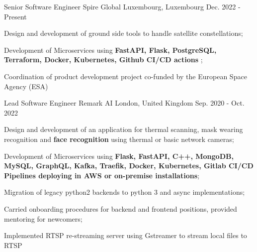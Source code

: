 

\begin{cventries}

  \cventry
  {Senior Software Engineer} %
  {Spire Global} %
  {Luxembourg, Luxembourg} %
  {Dec. 2022 - Present} %
  {
    \begin{cvitems} %
      \item {Design and development of ground side tools to handle satellite constellations;}
      \item {Development of Microservices using \textbf{FastAPI, Flask, PostgreSQL, Terraform, Docker, Kubernetes, Github CI/CD actions };}
      \item {Coordination of product development project co-funded by the European Space Agency (ESA)}
    \end{cvitems}
  }
   \cventry
    {Lead Software Engineer} %
    {Remark AI} %
    {London,  United Kingdom} %
    {Sep. 2020 - Oct. 2022} %
    {
      \begin{cvitems} %
        \item {Design and development of an application for thermal scanning,
        mask wearing recognition and \textbf{face recognition} using thermal or basic network cameras;}
        \item {Development of Microservices using \textbf{Flask, FastAPI, C++, MongoDB, MySQL, GraphQL, Kafka,
        Traefik, Docker, Kubernetes, Gitlab CI/CD Pipelines deploying in AWS or on-premise installations};}
        \item {Migration of legacy python2 backends to python 3 and async implementations;}
        \item {Carried onboarding procedures for backend and frontend positions, provided mentoring for newcomers;}
        \item {Implemented RTSP re-streaming server using Gstreamer to stream local files to RTSP}
      \end{cvitems}
    }


\end{cventries}
